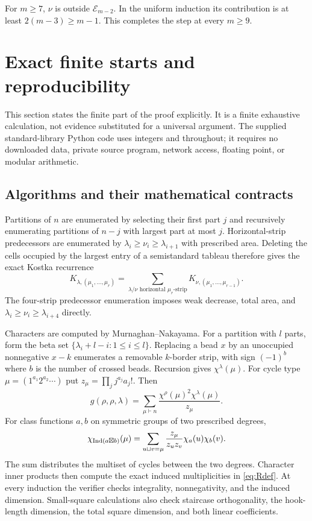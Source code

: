 \documentclass[11pt]{article}
\theoremstyle{remark}\newtheorem{remark}[theorem]{Remark}
\numberwithin{equation}{section}\setlength{\emergencystretch}{2em}
\begin{document}
For $m\ge7$, $\nu$ is outside $\mathcal E_{m-2}$. In the uniform
induction its contribution is at least $2(m-3)\ge m-1$. This completes
the step at every $m\ge9$.

\section{Exact finite starts and reproducibility}\label{sec:finite}
This section states the finite part of the proof explicitly. It is a
finite exhaustive calculation, not evidence substituted for a universal
argument. The supplied standard-library Python code uses integers and
 throughout; it requires no downloaded data, private
source program, network access, floating point, or modular arithmetic.

\subsection{Algorithms and their mathematical contracts}
Partitions of $n$ are enumerated by selecting their first part $j$ and
recursively enumerating partitions of $n-j$ with largest part at most $j$.
Horizontal-strip predecessors are enumerated by
$\lambda_i\ge\nu_i\ge\lambda_{i+1}$ with prescribed area.
Deleting the cells occupied by the largest entry of a semistandard tableau
therefore gives the exact Kostka recurrence
\[
 K_{\lambda,(\mu_1,\ldots,\mu_r)}
 =\sum_{\lambda/\nu\text{ horizontal }\mu_r\text{-strip}}
      K_{\nu,(\mu_1,\ldots,\mu_{r-1})}.
\]
The four-strip predecessor enumeration imposes weak decrease, total area,
and $\lambda_i\ge\nu_i\ge\lambda_{i+4}$ directly.

Characters are computed by Murnaghan--Nakayama. For a partition with
$l$ parts, form the beta set $\{\lambda_i+l-i:1\le i\le l\}$.
Replacing a bead $x$ by an unoccupied nonnegative $x-k$ enumerates a
removable $k$-border strip, with sign $(-1)^b$ where $b$ is the number
of crossed beads. Recursion gives $\chi^\lambda(\mu)$.
For cycle type $\mu=(1^{a_1}2^{a_2}\cdots)$ put
$z_\mu=\prod_j j^{a_j}a_j!$. Then
\begin{equation}\label{eq:finiteg}
 g(\rho,\rho,\lambda)=\sum_{\mu\vdash n}
       \frac{\chi^\rho(\mu)^2\chi^\lambda(\mu)}{z_\mu}.
\end{equation}
For class functions $a,b$ on symmetric groups of two prescribed degrees,
\begin{equation}\label{eq:finiteind}
 \chi_{\operatorname{Ind}(a\boxtimes b)}(\mu)
 =\sum_{u\sqcup v=\mu}\frac{z_\mu}{z_u z_v}\chi_a(u)\chi_b(v).
\end{equation}
The sum distributes the multiset of cycles between the two degrees.
Character inner products then compute the exact induced multiplicities
in \eqref{eq:Rdef}. At every induction the verifier checks integrality,
nonnegativity, and the induced dimension. Small-square calculations also
check staircase orthogonality, the hook-length dimension, the total square
dimension, and both linear coefficients.
\end{document}
